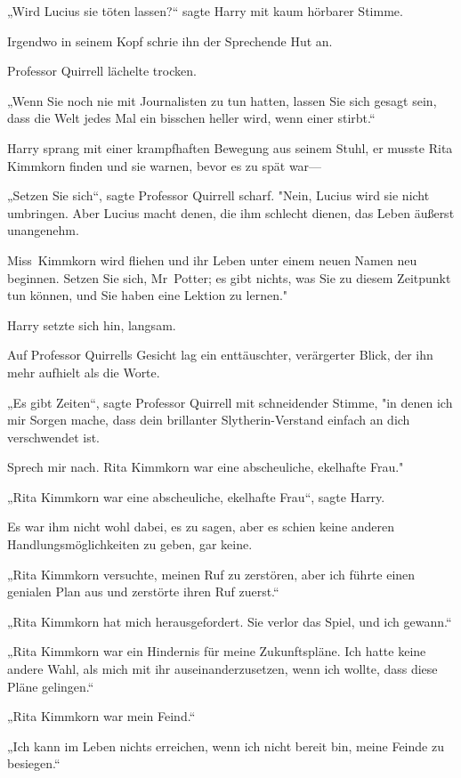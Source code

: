 {„Wird Lucius sie töten lassen?“ sagte Harry mit kaum hörbarer Stimme.

Irgendwo in seinem Kopf schrie ihn der Sprechende Hut an.

Professor Quirrell lächelte trocken.

„Wenn Sie noch nie mit Journalisten zu tun hatten, lassen Sie sich gesagt sein, dass die Welt jedes Mal ein bisschen heller wird, wenn einer stirbt.“

Harry sprang mit einer krampfhaften Bewegung aus seinem Stuhl, er musste Rita Kimmkorn finden und sie warnen, bevor es zu spät war—

„Setzen Sie sich“, sagte Professor Quirrell scharf. "Nein, Lucius wird sie nicht umbringen. Aber Lucius macht denen, die ihm schlecht dienen, das Leben äußerst unangenehm.

Miss~Kimmkorn wird fliehen und ihr Leben unter einem neuen Namen neu beginnen. Setzen Sie sich, Mr~Potter; es gibt nichts, was Sie zu diesem Zeitpunkt tun können, und Sie haben eine Lektion zu lernen."

Harry setzte sich hin, langsam.

Auf Professor Quirrells Gesicht lag ein enttäuschter, verärgerter Blick, der ihn mehr aufhielt als die Worte.

„Es gibt Zeiten“, sagte Professor Quirrell mit schneidender Stimme, "in denen ich mir Sorgen mache, dass dein brillanter Slytherin-Verstand einfach an dich verschwendet ist.

Sprech mir nach. Rita Kimmkorn war eine abscheuliche, ekelhafte Frau."

„Rita Kimmkorn war eine abscheuliche, ekelhafte Frau“, sagte Harry.

Es war ihm nicht wohl dabei, es zu sagen, aber es schien keine anderen Handlungsmöglichkeiten zu geben, gar keine.

„Rita Kimmkorn versuchte, meinen Ruf zu zerstören, aber ich führte einen genialen Plan aus und zerstörte ihren Ruf zuerst.“

„Rita Kimmkorn hat mich herausgefordert. Sie verlor das Spiel, und ich gewann.“

„Rita Kimmkorn war ein Hindernis für meine Zukunftspläne. Ich hatte keine andere Wahl, als mich mit ihr auseinanderzusetzen, wenn ich wollte, dass diese Pläne gelingen.“

„Rita Kimmkorn war mein Feind.“

„Ich kann im Leben nichts erreichen, wenn ich nicht bereit bin, meine Feinde zu besiegen.“

}
